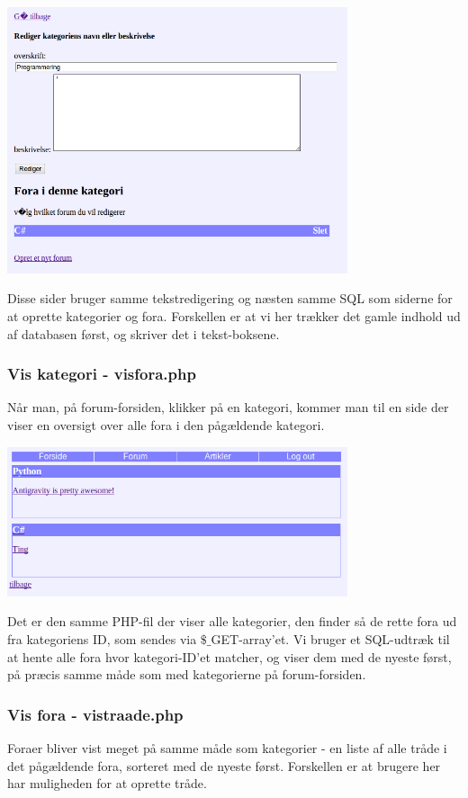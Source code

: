 \documentclass{article}
\begin{document}
\includegraphics[width=100mm]{mi02.png}

Disse sider bruger samme tekstredigering og næsten samme SQL som siderne for at oprette kategorier og fora. Forskellen er at vi her trækker det gamle indhold ud af databasen først, og skriver det i tekst-boksene.

\subsubsection[Vis kategori]{Vis kategori - visfora.php}
Når man, på forum-forsiden, klikker på en kategori, kommer man til en side der viser en oversigt over alle fora i den pågældende kategori. 

\includegraphics[width=100mm]{mi11.png}

Det er den samme PHP-fil der viser alle kategorier, den finder så de rette fora ud fra kategoriens ID, som sendes via $\$\_$GET-array'et. Vi bruger et SQL-udtræk til at hente alle fora hvor kategori-ID'et matcher, og viser dem med de nyeste først, på præcis samme måde som med kategorierne på forum-forsiden.

\subsubsection[Vis fora]{Vis fora - vistraade.php}
Foraer bliver vist meget på samme måde som kategorier - en liste af alle tråde i det pågældende fora, sorteret med de nyeste først. Forskellen er at brugere her har muligheden for at oprette tråde.
\end{document}
